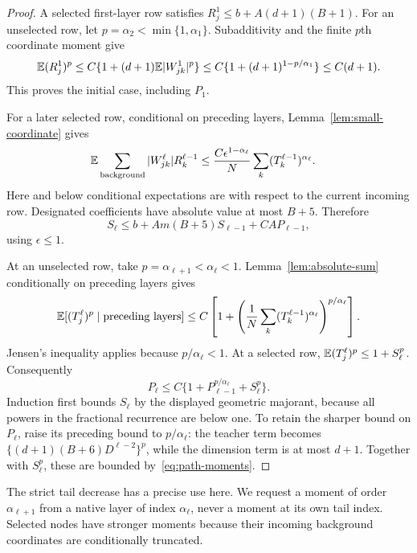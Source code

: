 \begin{proof}
A selected first-layer row satisfies $R_j^1\le b+A(d+1)(B+1)$. For an unselected row, let $p=\alpha_2<\min\{1,\alpha_1\}$. Subadditivity and the finite $p$th coordinate moment give
\[
 \mathbb E(R_j^1)^p
 \le C\{1+(d+1)\mathbb E|W_{jk}^1|^p\}
 \le C\{1+(d+1)^{1-p/\alpha_1}\}\le C(d+1).
\]
This proves the initial case, including $P_1$.

For a later selected row, conditional on preceding layers, Lemma~\ref{lem:small-coordinate} gives
\begin{align*}
 \mathbb E\sum_{\mathrm{background}}|W_{jk}^\ell|R_k^{\ell-1}
 &\le \frac{C\epsilon^{1-\alpha_\ell}}N
          \sum_k(T_k^{\ell-1})^{\alpha_\ell}.
\end{align*}
Here and below conditional expectations are with respect to the current incoming row. Designated coefficients have absolute value at most $B+5$. Therefore
\begin{equation}
 S_\ell\le b+Am(B+5)S_{\ell-1}+CA P_{\ell-1},
 \label{eq:selected-first-moment}
\end{equation}
using $\epsilon\le1$.

At an unselected row, take $p=\alpha_{\ell+1}<\alpha_\ell<1$. Lemma~\ref{lem:absolute-sum} conditionally on preceding layers gives
\[
 \mathbb E[(T_j^\ell)^p\mid\text{preceding layers}]
 \le C\left[1+
   \left(\frac1N\sum_k(T_k^{\ell-1})^{\alpha_\ell}\right)^{p/\alpha_\ell}
 \right].
\]
Jensen's inequality applies because $p/\alpha_\ell<1$. At a selected row, $\mathbb E(T_j^\ell)^p\le1+S_\ell^p$. Consequently
\begin{equation}
 P_\ell\le C\{1+P_{\ell-1}^{p/\alpha_\ell}+S_\ell^p\}.
 \label{eq:fractional-moment}
\end{equation}
Induction first bounds $S_\ell$ by the displayed geometric majorant, because all powers in the fractional recurrence are below one. To retain the sharper bound on $P_\ell$, raise its preceding bound to $p/\alpha_\ell$: the teacher term becomes $\{(d+1)(B+6)D^{\ell-2}\}^{p}$, while the dimension term is at most $d+1$. Together with $S_\ell^p$, these are bounded by~\eqref{eq:path-moments}.
\end{proof}

The strict tail decrease has a precise use here. We request a moment of order $\alpha_{\ell+1}$ from a native layer of index $\alpha_\ell$, never a moment at its own tail index. Selected nodes have stronger moments because their incoming background coordinates are conditionally truncated.

